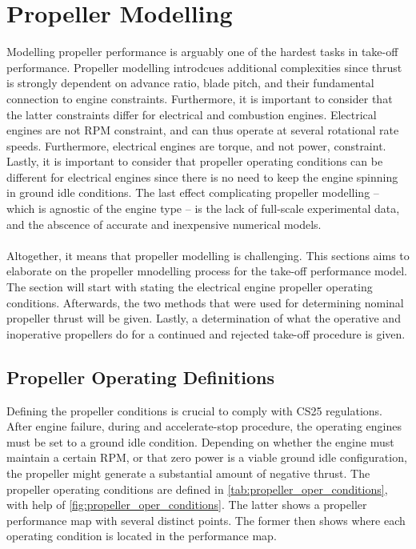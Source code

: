 \section{Propeller Modelling}
Modelling propeller performance is arguably one of the hardest tasks in take-off performance. Propeller modelling introdcues additional complexities since thrust is strongly dependent on advance ratio, blade pitch, and their fundamental connection to engine constraints. Furthermore, it is important to consider that the latter constraints differ for electrical and combustion engines. Electrical engines are not RPM constraint, and can thus operate at several rotational rate speeds. Furthermore, electrical engines are torque, and not power, constraint. Lastly, it is important to consider that propeller operating conditions can be different for electrical engines since there is no need to keep the engine spinning in ground idle conditions. The last effect complicating propeller modelling -- which is agnostic of the engine type -- is the lack of full-scale experimental data, and the abscence of accurate and inexpensive numerical models.\\
\\
Altogether, it means that propeller modelling is challenging. This sections aims to elaborate on the propeller mnodelling process for the take-off performance model. The section will start with stating the electrical engine propeller operating conditions. Afterwards, the two methods that were used for determining nominal propeller thrust will be given. Lastly, a determination of what the operative and inoperative propellers do for a continued and rejected take-off procedure is given.

\subsection{Propeller Operating Definitions}
Defining the propeller conditions is crucial to comply with CS25 regulations. After engine failure, during and accelerate-stop procedure, the operating engines must be set to a ground idle condition. Depending on whether the engine must maintain a certain RPM, or that zero power is a viable ground idle configuration, the propeller might generate a substantial amount of negative thrust. The propeller operating conditions are defined in \autoref{tab:propeller_oper_conditions}, with help of \autoref{fig:propeller_oper_conditions}. The latter shows a propeller performance map with several distinct points. The former then shows where each operating condition is located in the performance map.

